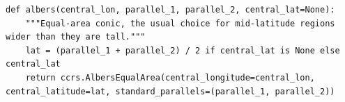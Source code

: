 \begin{lstlisting}[firstnumber=50]
def albers(central_lon, parallel_1, parallel_2, central_lat=None):
    """Equal-area conic, the usual choice for mid-latitude regions wider than they are tall."""
    lat = (parallel_1 + parallel_2) / 2 if central_lat is None else central_lat
    return ccrs.AlbersEqualArea(central_longitude=central_lon, central_latitude=lat, standard_parallels=(parallel_1, parallel_2))
\end{lstlisting}
